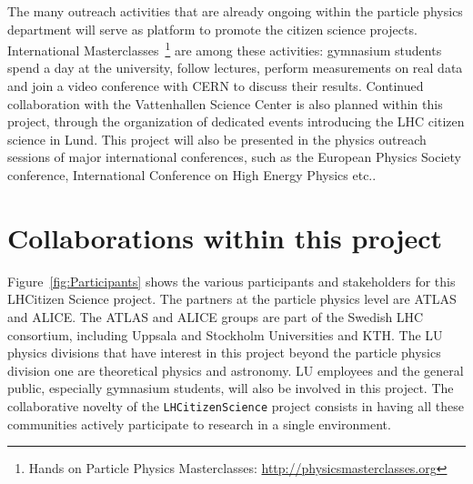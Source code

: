 \documentclass[a4paper,justified]{tufte-handout}
\begin{document}
The many outreach activities that are already ongoing within the particle
physics department will serve as platform to promote the citizen science
projects. International Masterclasses~\footnote{Hands on Particle Physics
  Masterclasses: \url{http://physicsmasterclasses.org}} are among these
activities: gymnasium students spend a day at the university, follow lectures,
perform measurements on real data and join a video conference with CERN to
discuss their results. Continued collaboration with the Vattenhallen Science
Center is also planned within this project, through the organization of
dedicated events introducing the LHC citizen science in Lund.
This project will also be presented in the physics outreach sessions of major international conferences, such as the European Physics Society conference, International Conference on High Energy Physics etc.. 

\vspace{-10px}
\section{Collaborations within this project} \label{sec:collaborations}
\vspace{-10px}





Figure~\ref{fig:Participants} shows the various participants and stakeholders for this LHCitizen Science project. The partners at the particle physics level are ATLAS and ALICE. The ATLAS and ALICE groups are part of the Swedish LHC consortium, including Uppsala and Stockholm Universities and KTH. The LU physics divisions that have interest in this project beyond the particle physics division one are theoretical physics and astronomy. LU employees and the general public, especially gymnasium students, will also be involved in this project. The collaborative novelty of the \texttt{LHCitizenScience} project consists in having all these communities  actively participate to research in a single environment. 
\end{document}
